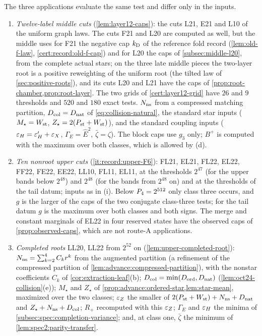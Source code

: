 \begin{remark}\label{rem:spectral-criterion:uses}
The three applications evaluate the same test and differ only in the inputs.
\begin{enumerate}[label=\textup{(\roman*)}]
\item \emph{Twelve-label middle cuts} (\cref{lem:layer12-caps}): the cuts L21, E21
  and L10 of the uniform graph laws. The cuts F21 and L20 are computed as well,
  but the middle uses for F21 the negative cap $k_{\rm D}$ of the reference fold
  record (\cref{lem:old-f-law}, \cref{cert:record:old-f-cap}) and for L20 the caps
  of \cref{subsec:middle-l20}, from the complete actual stars; on the three late middle pieces the two-layer root is a positive reweighting of the uniform root (the tilted law of \cref{sec:positive-roots}), and its cuts L20 and L21 have the
  caps of \cref{prop:root-chamber,prop:root-layer}.
  The two grids of \cref{cert:layer12-grid} have $26$ and $9$ thresholds and
  $520$ and $180$ exact tests. $N_{\rm ns}$ from a compressed
  matching partition, $D_{\rm col}=D_{\rm nat}$ of \eqref{eq:collision-natural}, the standard
  star inputs ($M_\star=W_{\rm st}$, $Z_\star=2(P_{\rm st}+W_{\rm st})$), and the standard
  coupling inputs ($\varepsilon_H=\varepsilon'_H+\varepsilon_X$, $\Gamma_E=\hat E^2$, $\bar\zeta=\zeta$). The
  block caps use $g_3$ only; $B^+$ is computed with the maximum over both classes,
  which is allowed by (d).
\item \emph{Ten nonroot upper cuts} (\ref{it:record:upper-F6}): FL21, EL21, FL22,
  EL22, FF22, FE22, EE22, LL10, FL11, EL11, at the thresholds $2^{47}$ (for the
  upper bands below $2^{48}$) and $2^{48}$ (for the bands from $2^{48}$ on) and at
  the thresholds of the tail datum; inputs as in (i).
  Below $P_4=2^{512}$ only class three occurs, and $g$ is the larger of the caps of the
  two conjugate class-three tests; for the tail datum $g$ is the maximum over both
  classes and both signs. The merge and constant marginals of EL22 in four
  reserved states have the observed caps of \cref{prop:observed-caps}, which are
  not route-A applications.
\item \emph{Completed roots} LL20, LL22 from $2^{52}$ on
  (\cref{lem:upper-completed-root}): $N_{\rm ns}=\sum_{k=2}^4C_kr^k$ from the augmented
  partition (a refinement of the compressed partition of
  \cref{lem:advance:compressed-partition}), with the nonstar coefficients $C_k$ of
  \cref{cor:extraction-leaf}(b); $D_{\rm col}=\min(D_{\rm ord},D_{\rm nat})$
  (\cref{lem:oct24-collision}(e)); $M_\star$ and $Z_\star$ of
  \cref{prop:advance:ordered-star,lem:star-mean}, maximized over the two classes;
  $\varepsilon_Z$ the smaller of $2(P_{\rm st}+W_{\rm st})+N_{\rm ns}+D_{\rm nat}$ and
  $Z_\star+N_{\rm ns}+D_{\rm col}$; $R_+$ recomputed with this $\varepsilon_Z$; $\Gamma_E$ and $\varepsilon_H$
  the minima of \cref{subsec:spec:completion-variance}; and, at class one, $\bar\zeta$
  the minimum of \cref{lem:spec2:parity-transfer}.
\end{enumerate}
\end{remark}

